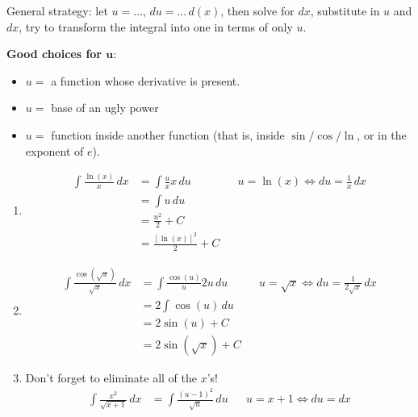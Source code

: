 General strategy: let $ u=\ldots $, $ du=\ldots\,d(x) $, then solve for
$ dx $, substitute in $ u $ and $ dx $, try to transform the integral into one
in terms of only $ u $.

\textbf{Good choices for $ \bm{u} $}:
\begin{itemize}
    \item $ u= $ a function whose derivative is present.
    \item $ u= $ base of an ugly power
    \item $ u= $ function inside another function (that is, inside $ \sin/\cos/\ln $,
          or in the exponent of $ e $).
\end{itemize}

\begin{Example}{}{}
    \begin{enumerate}[label=(\roman*)]
        \item \begin{align*}
                  \int \frac{\ln(x)}{x} \, d{x}
                   & =\int \frac{u}{x} x\, d{u} &  & u=\ln(x)\iff du=\frac{1}{x}\, dx \\
                   & =\int u\, d{u}                                                   \\
                   & =\frac{u^2}{2} +C                                                \\
                   & =\frac{[\ln(x)]^2}{2} +C
              \end{align*}
        \item \begin{align*}
                  \int \frac{\cos(\sqrt{x})}{\sqrt{x}} \, d{x}
                   & = \int \frac{\cos(u)}{u}2u \, d{u} &  & u=\sqrt{x}\iff du=\frac{1}{2\sqrt{x}}\, dx \\
                   & =2 \int \cos(u)\, d{u}                                                             \\
                   & =2\sin(u)+C                                                                        \\
                   & =2\sin(\sqrt{x})+C
              \end{align*}
        \item Don't forget to eliminate all of the $ x $'s!
              \begin{align*}
                  \int \frac{x^2}{\sqrt{x+1}} \, d{x}
                   & =\int \frac{(u-1)^2}{\sqrt{u}} \, d{u}                                                     &  & u=x+1\iff du=dx \\

\end{align*}
\end{enumerate}
\end{Example}
